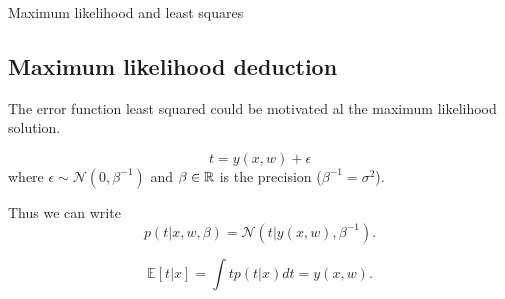   \begin{frame}{Maximum likelihood and least squares}
    \subsection{Maximum likelihood deduction}
    The error function least squared could be motivated
    al the maximum likelihood solution. 
  
    \begin{equation}
      t = y(x,w) + \epsilon 
    \end{equation}
    where $\epsilon \sim \mathcal{N}(0, \beta^{-1})$ 
    and $\beta \in \mathbb{R}$ is the precision ($\beta^{-1} = \sigma^2$). 
  
    Thus we can write
    \begin{equation}
      p(t | x, w, \beta) = \mathcal{N}(t | y(x,w), \beta^{-1}). 
    \end{equation}
  
    \begin{equation}
      \mathbb{E}[t | x] = 
      \int t p(t|x) dt
      = y(x,w).
    \end{equation}
    
  \end{frame}
  
